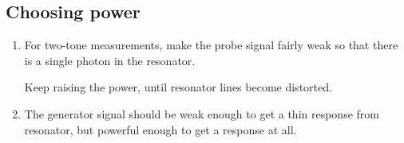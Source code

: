 \subsection{Choosing power}
\label{sec:choosing-power}

\begin{enumerate}
\item For  two-tone measurements, make  the probe signal  
  fairly weak so that there is a single photon in the resonator.

  Keep raising the power, until resonator lines become distorted.

\item The generator signal  should be weak enough to get a
  thin response from resonator, but powerful enough to get a response at
  all.
\end{enumerate}

\newpage
